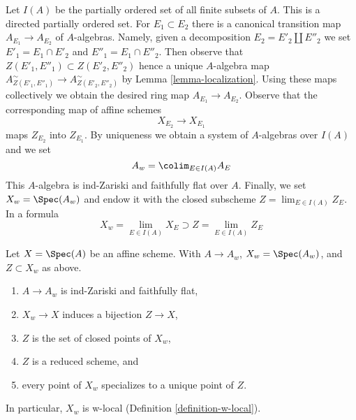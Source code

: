 \medskip\noindent
Let $I(A)$ be the partially ordered set of all finite subsets of $A$.
This is a directed partially ordered set. For $E_1 \subset E_2$ there
is a canonical transition map $A_{E_1} \to A_{E_2}$ of $A$-algebras.
Namely, given a decomposition $E_2 = E'_2 \amalg E''_2$ we set
$E'_1 = E_1 \cap E'_2$ and $E''_1 = E_1 \cap E''_2$. Then observe that
$Z(E'_1, E''_1) \subset Z(E'_2, E''_2)$ hence a unique $A$-algebra map
$A_{Z(E'_1, E''_1)}^\sim \to A_{Z(E'_2, E''_2)}^\sim$ by
Lemma \ref{lemma-localization}. Using these maps collectively we obtain
the desired ring map $A_{E_1} \to A_{E_2}$. Observe that the corresponding
map of affine schemes
\begin{equation}
\label{equation-transition}
X_{E_2} \longrightarrow X_{E_1}
\end{equation}
maps $Z_{E_2}$ into $Z_{E_1}$. By uniqueness we obtain a system of
$A$-algebras over $I(A)$ and we set
\begin{equation}
\label{equation-colimit-ring}
A_w = \colim_{E \in I(A)} A_E
\end{equation}
This $A$-algebra is ind-Zariski and faithfully flat over $A$.
Finally, we set $X_w = \Spec(A_w)$ and endow it with the closed subscheme
$Z = \lim_{E \in I(A)} Z_E$. In a formula
\begin{equation}
\label{equation-final}
X_w = \lim_{E \in I(A)} X_E \supset Z = \lim_{E \in I(A)} Z_E
\end{equation}

\begin{lemma}
\label{lemma-make-w-local}
Let $X = \Spec(A)$ be an affine scheme. With $A \to A_w$, $X_w = \Spec(A_w)$,
and $Z \subset X_w$ as above.
\begin{enumerate}
\item $A \to A_w$ is ind-Zariski and faithfully flat,
\item $X_w \to X$ induces a bijection $Z \to X$,
\item $Z$ is the set of closed points of $X_w$,
\item $Z$ is a reduced scheme, and
\item every point of $X_w$ specializes to a unique point of $Z$.
\end{enumerate}
In particular, $X_w$ is w-local (Definition \ref{definition-w-local}).
\end{lemma}

